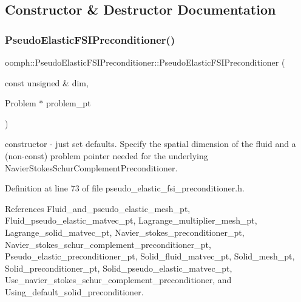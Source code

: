 \subsection{Constructor \& Destructor Documentation}
\mbox{\label{classoomph_1_1PseudoElasticFSIPreconditioner_aa3132ef3e4ecd57adf64da72e84b5d9d}} 
\subsubsection{\texorpdfstring{Pseudo\+Elastic\+F\+S\+I\+Preconditioner()}{PseudoElasticFSIPreconditioner()}\hspace{0.1cm}{\footnotesize\ttfamily [1/2]}}
{\footnotesize\ttfamily oomph\+::\+Pseudo\+Elastic\+F\+S\+I\+Preconditioner\+::\+Pseudo\+Elastic\+F\+S\+I\+Preconditioner (\begin{DoxyParamCaption}\item[{const unsigned \&}]{dim,  }\item[{Problem $\ast$}]{problem\+\_\+pt }\end{DoxyParamCaption})\hspace{0.3cm}{\ttfamily [inline]}}



constructor -\/ just set defaults. Specify the spatial dimension of the fluid and a (non-\/const) problem pointer needed for the underlying Navier\+Stokes\+Schur\+Complement\+Preconditioner. 



Definition at line 73 of file pseudo\+\_\+elastic\+\_\+fsi\+\_\+preconditioner.\+h.



References Fluid\+\_\+and\+\_\+pseudo\+\_\+elastic\+\_\+mesh\+\_\+pt, Fluid\+\_\+pseudo\+\_\+elastic\+\_\+matvec\+\_\+pt, Lagrange\+\_\+multiplier\+\_\+mesh\+\_\+pt, Lagrange\+\_\+solid\+\_\+matvec\+\_\+pt, Navier\+\_\+stokes\+\_\+preconditioner\+\_\+pt, Navier\+\_\+stokes\+\_\+schur\+\_\+complement\+\_\+preconditioner\+\_\+pt, Pseudo\+\_\+elastic\+\_\+preconditioner\+\_\+pt, Solid\+\_\+fluid\+\_\+matvec\+\_\+pt, Solid\+\_\+mesh\+\_\+pt, Solid\+\_\+preconditioner\+\_\+pt, Solid\+\_\+pseudo\+\_\+elastic\+\_\+matvec\+\_\+pt, Use\+\_\+navier\+\_\+stokes\+\_\+schur\+\_\+complement\+\_\+preconditioner, and Using\+\_\+default\+\_\+solid\+\_\+preconditioner.

